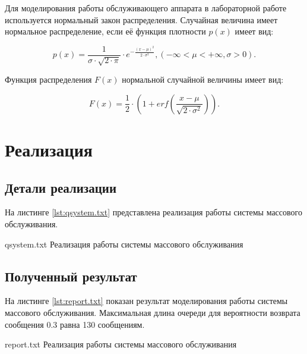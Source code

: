 Для моделирования работы обслуживающего аппарата в лабораторной работе используется нормальный закон распределения. Случайная величина имеет нормальное распределение, если её функция плотности $p(x)$ имеет вид:

\begin{equation}
    p(x) = \frac{1}{\sigma \cdot \sqrt{2 \cdot \pi}} \cdot e^{-\frac{(x - \mu)^2}{2 \cdot \sigma^2}}, (-\infty < \mu < +\infty, \sigma > 0).
\end{equation}

Функция распределения $F(x)$ нормальной случайной величины имеет вид:

\begin{equation}
    F(x) = \frac{1}{2} \cdot (1 + erf(\frac{x - \mu}{\sqrt{2 \cdot \sigma^2}})).
\end{equation}

\chapter{Реализация}

\section{Детали реализации}

На листинге \ref{lst:qsystem.txt} представлена реализация работы системы массового обслуживания.

    {qsystem.txt}
    {Реализация работы системы массового обслуживания}
\newpage

\section{Полученный результат}

На листинге \ref{lst:report.txt} показан результат моделирования работы системы массового обслуживания. Максимальная длина очереди для вероятности возврата сообщения 0.3 равна 130 сообщениям.

    {report.txt}
    {Реализация работы системы массового обслуживания}
\newpage

